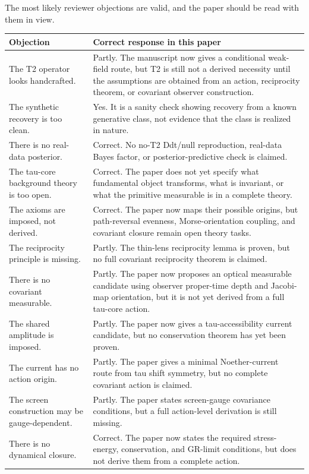 \documentclass[11pt]{article}
\newcounter{none} %
\begin{document}
The most likely reviewer objections are valid, and the paper should be
read with them in view.

{\def\LTcaptype{none} %
\begin{longtable}[]{@{}
  >{\raggedright\arraybackslash}p{}
  >{\raggedright\arraybackslash}p{}@{}}
\toprule\noalign{}
\begin{minipage}[b]{\linewidth}\raggedright
Objection
\end{minipage} & \begin{minipage}[b]{\linewidth}\raggedright
Correct response in this paper
\end{minipage} \\
\midrule\noalign{}
\endhead
\bottomrule\noalign{}
\endlastfoot
The T2 operator looks handcrafted. & Partly. The manuscript now gives a
conditional weak-field route, but T2 is still not a derived necessity
until the assumptions are obtained from an action, reciprocity theorem,
or covariant observer construction. \\
The synthetic recovery is too clean. & Yes. It is a sanity check showing
recovery from a known generative class, not evidence that the class is
realized in nature. \\
There is no real-data posterior. & Correct. No no-T2 Ddt/null
reproduction, real-data Bayes factor, or posterior-predictive check is
claimed. \\
The tau-core background theory is too open. & Correct. The paper does
not yet specify what fundamental object transforms, what is invariant,
or what the primitive measurable is in a complete theory. \\
The axioms are imposed, not derived. & Correct. The paper now maps their
possible origins, but path-reversal evenness, Morse-orientation
coupling, and covariant closure remain open theory tasks. \\
The reciprocity principle is missing. & Partly. The thin-lens
reciprocity lemma is proven, but no full covariant reciprocity theorem
is claimed. \\
There is no covariant measurable. & Partly. The paper now proposes an
optical measurable candidate using observer proper-time depth and
Jacobi-map orientation, but it is not yet derived from a full tau-core
action. \\
The shared amplitude is imposed. & Partly. The paper now gives a
tau-accessibility current candidate, but no conservation theorem has yet
been proven. \\
The current has no action origin. & Partly. The paper gives a minimal
Noether-current route from tau shift symmetry, but no complete covariant
action is claimed. \\
The screen construction may be gauge-dependent. & Partly. The paper
states screen-gauge covariance conditions, but a full action-level
derivation is still missing. \\
There is no dynamical closure. & Correct. The paper now states the
required stress-energy, conservation, and GR-limit conditions, but does
not derive them from a complete action. \\
\end{longtable}
}
\end{document}
